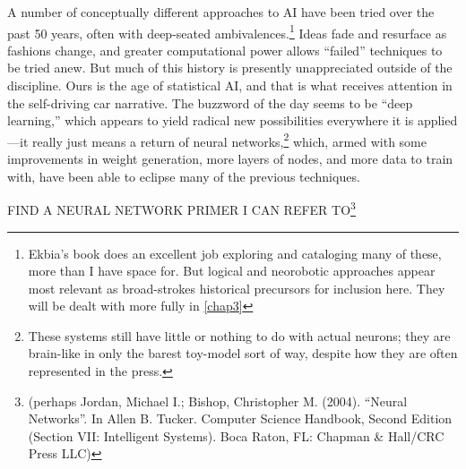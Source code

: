 A number of conceptually different approaches to AI have been tried
over the past 50 years, often with deep-seated
ambivalences.\footnote{Ekbia's book does an excellent job
  exploring and cataloging many of these, more than I have space for.
  But logical and neorobotic approaches appear most relevant as
  broad-strokes historical precursors for inclusion here. They will be
dealt with more fully in \ref{chap3}} Ideas fade
and resurface as fashions change, and greater computational power
allows ``failed'' techniques to be tried anew. But much of this
history is presently unappreciated outside of the discipline. Ours is the age of
statistical AI, and that is what receives attention in the
self-driving car narrative. The buzzword of the day seems to be ``deep
learning,'' which
appears to yield radical new possibilities everywhere it is
applied---it really just means a return of neural
networks,\footnote{These systems still have little or nothing to do
  with actual neurons; they are brain-like in only the barest
  toy-model sort of way, despite how they are often represented in the
  press.} which, armed with some improvements in weight generation,
more layers of
nodes, and more data to train with, have been able to eclipse many of
the previous techniques\cite{???}.

FIND A NEURAL NETWORK PRIMER I CAN REFER TO\footnote{
(perhaps Jordan, Michael I.; Bishop, Christopher M. (2004). ``Neural
Networks''. In Allen B. Tucker. Computer Science Handbook, Second
Edition (Section VII: Intelligent Systems). Boca Raton, FL: Chapman \&
Hall/CRC Press LLC)}

